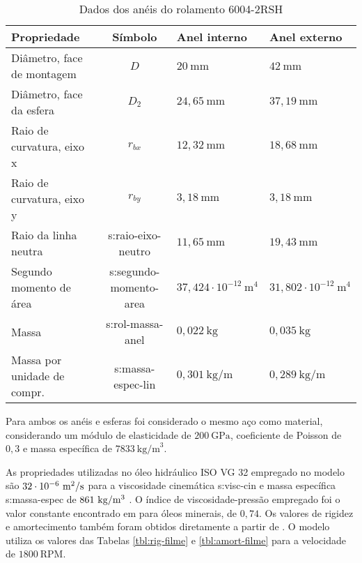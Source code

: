 \documentclass[12pt,oneside,english,brazil,lmodern,siglas,simbolos,cite=num]{ucsmonograph}
\begin{document}
	\begin{table}[b]
	\def\arraystretch{1.2}
	\caption{Dados dos anéis do rolamento 6004-2RSH}
	\begin{tabular}{l|c|l|l}
	\toprule
	\textbf{Propriedade} & \textbf{Símbolo} & \textbf{Anel interno} & \textbf{Anel externo} \\\midrule
	Diâmetro, face de montagem & $D$ & $20\ \text{mm}$ & $ 42\ \text{mm}$ \\
	Diâmetro, face da esfera & $D_2$ & $24,65\ \text{mm}$ & $37,19\ \text{mm}$ \\
	Raio de curvatura, eixo x & $r_{bx}$ & $12,32\ \text{mm}$ & $18,68\ \text{mm}$ \\
	Raio de curvatura, eixo y & $r_{by}$ & $3,18\ \text{mm}$ & $3,18\ \text{mm}$ \\
	Raio da linha neutra & \gls{s:raio-eixo-neutro} & $11,65\ \text{mm}$ & $19,43\ \text{mm}$ \\
	Segundo momento de área & \gls{s:segundo-momento-area} & $37,424\cdot 10^{-12}\ \text{m}^4$ & $31,802\cdot 10^{-12}\ \text{m}^4$ \\
	Massa & \gls{s:rol-massa-anel} & $0,022\ \text{kg}$ & $0,035\ \text{kg}$ \\
	Massa por unidade de compr. & \gls{s:massa-espec-lin} & $0,301\ \text{kg/m}$ & $0,289\ \text{kg/m}$ \\\bottomrule
	\end{tabular}
	\label{tbl:6004-aneis}
	\end{table}
	
	Para ambos os anéis e esferas foi considerado o mesmo aço como material, considerando um módulo de elasticidade de $200\ \text{GPa}$, coeficiente de Poisson de $ 0,3 $ e massa específica de $ 7833\ \text{kg/m}^3$.
	
	As propriedades utilizadas no óleo hidráulico ISO VG 32 empregado no modelo são $32\cdot 10^{-6}\ \text{m\textsuperscript{2}/s}$ para a viscosidade cinemática \gls{s:visc-cin} e massa específica \gls{s:massa-espec} de $861\ \text{kg/m\textsuperscript{3}}$ \cite{iso-vg32}.
	O índice de viscosidade-pressão empregado foi o valor constante encontrado em \cite{roelands:1966} para óleos minerais, de $0,74$.
	Os valores de rigidez e amortecimento também foram obtidos diretamente a partir de \cite{nonato:2014}.
	O modelo utiliza os valores das Tabelas \ref{tbl:rig-filme} e \ref{tbl:amort-filme} para a velocidade de $1800\ \text{RPM}$.

	\begin{figure}[t]
		\label{fig:3d-rolamento}
	\end{figure}
\end{document}
